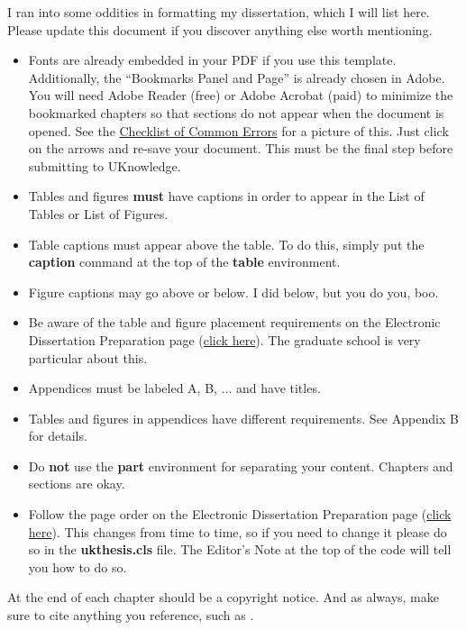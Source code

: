 \documentclass[final]{ukthesis} %
\begin{document}
I ran into some oddities in formatting my dissertation, which I will list here. Please update this document if you discover anything else worth mentioning.

\begin{itemize}
\item Fonts are already embedded in your PDF if you use this template. Additionally, the ``Bookmarks Panel and Page'' is already chosen in Adobe. You will need Adobe Reader (free) or Adobe Acrobat (paid) to minimize the bookmarked chapters so that sections do not appear when the document is opened. See the \href{http://gradschool.uky.edu/sites/gradschool.uky.edu/files/Documents/ThesisDissertationPrep/Checklist_Common_Errors_2019.pdf}{Checklist of Common Errors} for a picture of this. Just click on the arrows and re-save your document. This must be the final step before submitting to UKnowledge.
\item Tables and figures \textbf{must} have captions in order to appear in the List of Tables or List of Figures.
\item Table captions must appear above the table. To do this, simply put the \textbf{caption} command at the top of the \textbf{table} environment.
\item Figure captions may go above or below. I did below, but you do you, boo.
\item Be aware of the table and figure placement requirements on the Electronic Dissertation Preparation page (\href{http://gradschool.uky.edu/electronic-dissertation-preparation#Tables}{click here}). The graduate school is very particular about this.
\item Appendices must be labeled A, B, $\ldots$ and have titles.
\item Tables and figures in appendices have different requirements. See Appendix B for details.
\item Do \textbf{not} use the \textbf{part} environment for separating your content. Chapters and sections are okay.
\item Follow the page order on the Electronic Dissertation Preparation page (\href{http://gradschool.uky.edu/electronic-dissertation-preparation#PageOrder}{click here}). This changes from time to time, so if you need to change it please do so in the \textbf{ukthesis.cls} file. The Editor's Note at the top of the code will tell you how to do so.
\end{itemize}




At the end of each chapter should be a copyright notice. And as always, make sure to cite anything you reference, such as \cite{diffie1976new}.
\end{document}
